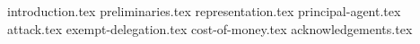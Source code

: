 {introduction.tex}
{preliminaries.tex}
{representation.tex}
{principal-agent.tex}
{attack.tex}
{exempt-delegation.tex}
{cost-of-money.tex}
\ifanonymous\else
{acknowledgements.tex}
\fi
